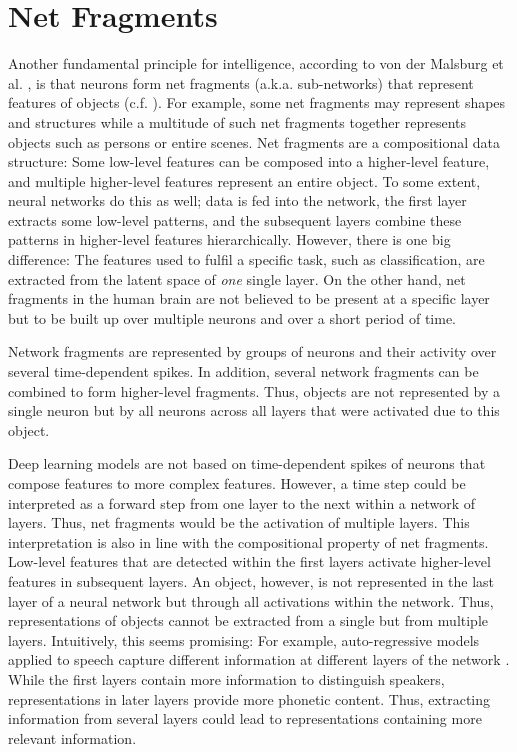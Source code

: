 \section{Net Fragments}
Another fundamental principle for intelligence, according to von der Malsburg et al. , is that neurons form net fragments (a.k.a. sub-networks) that represent features of objects (c.f. ).
For example, some net fragments may represent shapes and structures while a multitude of such net fragments together represents objects such as persons or entire scenes.
Net fragments are a compositional data structure: Some low-level features can be composed into a higher-level feature, and multiple higher-level features represent an entire object.
To some extent, neural networks do this as well; data is fed into the network, the first layer extracts some low-level patterns, and the subsequent layers combine these patterns in higher-level features hierarchically.
However, there is one big difference: The features used to fulfil a specific task, such as classification, are extracted from the latent space of \emph{one} single layer.
On the other hand, net fragments in the human brain are not believed to be present at a specific layer but to be built up over multiple neurons and over a short period of time.

\begin{claim}
	Network fragments are represented by groups of neurons and their activity over several time-dependent spikes. In addition, several network fragments can be combined to form higher-level fragments. Thus, objects are not represented by a single neuron but by all neurons across all layers that were activated due to this object.
\end{claim}

Deep learning models are not based on time-dependent spikes of neurons that compose features to more complex features.
However, a time step could be interpreted as a forward step from one layer to the next within a network of layers.
Thus, net fragments would be the activation of multiple layers.
This interpretation is also in line with the compositional property of net fragments.
Low-level features that are detected within the first layers activate higher-level features in subsequent layers.
An object, however, is not represented in the last layer of a neural network but through all activations within the network.
Thus, representations of objects cannot be extracted from a single but from multiple layers.
Intuitively, this seems promising:
For example, auto-regressive models applied to speech capture different information at different layers of the network .
While the first layers contain more information to distinguish speakers, representations in later layers provide more phonetic content.
Thus, extracting information from several layers could lead to representations containing more relevant information.

